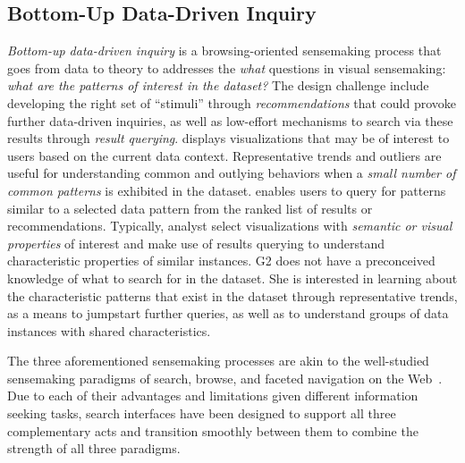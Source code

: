   \subsection{Bottom-Up Data-Driven Inquiry}
  \textit{Bottom-up data-driven inquiry} is a browsing-oriented sensemaking process that goes from data to theory to
  addresses the \textit{what} questions in visual sensemaking: \textit{what are the patterns of interest in the dataset?} The design challenge include developing the right set of ``stimuli'' through \textit{recommendations} that could provoke further data-driven inquiries, as well as low-effort mechanisms to search via these results through \textit{result querying}.
   displays visualizations that may be of interest to users based on the current data context. Representative trends and outliers are useful for understanding common and outlying behaviors when a \emph{small number of common patterns} is exhibited in the dataset. %
   enables users to query for patterns similar to a selected data pattern from the ranked list of results or recommendations. Typically, analyst select visualizations with \emph{semantic or visual properties} of interest and make use of results querying to understand characteristic properties of similar instances.
   G2 does not have a preconceived knowledge of what to search for in the dataset. She is interested in learning about the characteristic patterns that exist in the dataset through representative trends, as a means to jumpstart further queries, as well as to understand groups of data instances with shared characteristics.
  \par The three aforementioned sensemaking processes are akin to the well-studied sensemaking paradigms of search, browse, and faceted navigation on the Web~\cite{Hearst2009,Olston2003}. Due to each of their advantages and limitations given different information seeking tasks, search interfaces have been designed to support all three complementary acts and transition smoothly between them to combine the strength of all three paradigms. 
